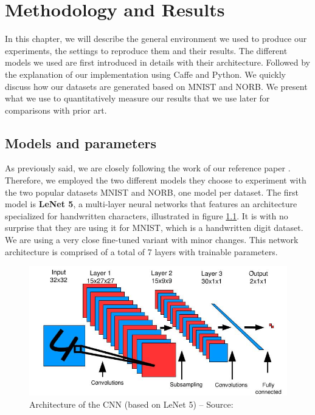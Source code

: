 \documentclass[a4paper,12pt]{report}
\begin{document}
\chapter{Methodology and Results}

In this chapter, we will describe the general environment we used to produce our experiments, the settings to reproduce them and their results.
The different models we used are first introduced in details with their architecture.
Followed by the explanation of our implementation using Caffe and Python.
We quickly discuss how our datasets are generated based on MNIST and NORB.
We present what we use to quantitatively measure our results that we use later for comparisons with prior art.

\section{Models and parameters}

As previously said, we are closely following the work of our reference paper \cite{hadsell2006dimensionality}.
Therefore, we employed the two different models they choose to experiment with the two popular datasets MNIST and NORB, one model per dataset.
The first model is {\bf LeNet 5}, a multi-layer neural networks that features an architecture specialized for handwritten characters, illustrated in figure \ref{fig:siamese_cnn}.
It is with no surprise that they are using it for MNIST, which is a handwritten digit dataset.
We are using a very close fine-tuned variant with minor changes.
This network architecture is comprised of a total of 7 layers with trainable parameters.

\begin{figure}[t]
    \begin{center}
        \includegraphics{thesis_figures/siamese_cnn.jpg}
    \end{center}
    \caption{Architecture of the CNN (based on LeNet 5) -- Source: \cite{hadsell2006dimensionality}}
    \label{fig:siamese_cnn}
\end{figure}
\end{document}
